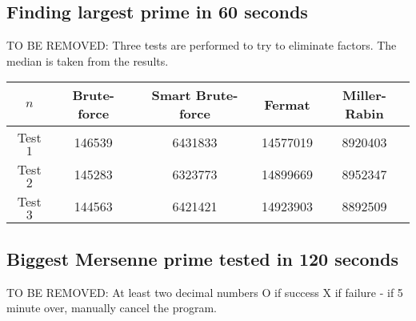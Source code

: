 \documentclass[main.tex]{subfiles}
\begin{document}
\subsection{Finding largest prime in 60 seconds}

TO BE REMOVED:
Three tests are performed to try to eliminate factors. The median is taken from
the results.

\begin{table}[ht!]
  \centering
  \begin{tabular}{||c | c c c c||}
    \hline
    $n$ & Brute-force & Smart Brute-force & Fermat & Miller-Rabin \\ [0.5ex] 
    \hline\hline
    Test $1$ & 146539 & 6431833 & 14577019 & 8920403\\ 
    Test $2$ & 145283 & 6323773 & 14899669 & 8952347\\ 
    Test $3$ & 144563 & 6421421 & 14923903 & 8892509\\   [1ex] 
    \hline
  \end{tabular}
\end{table}

\subsection{Biggest Mersenne prime tested in 120 seconds}

TO BE REMOVED:
At least two decimal numbers O if success X if failure - if 5 minute over,
manually cancel the program.
\end{document}
